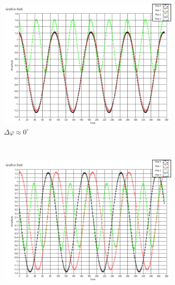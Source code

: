 \documentclass[a4paper]{article}
\begin{document}
\begin{figure}[!h]
    \centering
    
    ~ %
    \begin{subfigure}[b]{0.45\textwidth}
        \includegraphics[width=\textwidth]{es24_circa0grad}
        \caption{$\Delta \varphi \approx 0^{\circ}$}
        \label{fig:tiger}
    \end{subfigure}\quad
    ~ %
    \begin{subfigure}[b]{0.45\textwidth}
        \includegraphics[width=\textwidth]{es24_circa80grad}

\end{subfigure}
\end{figure}
\end{document}
